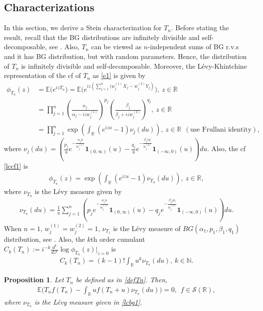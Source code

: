 \documentclass[12pt, a4paper,reqno]{amsart}
\newtheorem{pro}[thm]{Proposition}
\theoremstyle{definition}
\theoremstyle{myremark}
\numberwithin{equation}{section}
\begin{document}
\subsection{Characterizations}
 In this section, we derive a Stein characterization for $T_n$. Before stating the result, recall that the BG distributions are infinitely divisible and self-decomposable, see \cite{bilateral0}. Also, $T_n$ can be viewed as $n$-independent sums of BG r.v.s and it has BG distribution, but with random parameters. Hence, the distribution of $T_n$ is infinitely divisible and self-decomposable. Moreover, the L\'evy-Khintchine representation of the cf of $T_n$ as \eqref{e1} is given by
\begin{align}
\nonumber\phi_{T_n}(z)&=\mathbb{E}\bigg(e^{iz T_n} \bigg)=\mathbb{E}\bigg(e^{iz \left(\sum_{j=1}^{n} (w_j^{(1)}X_j-w_j^{(2)}Y_j\right) }\bigg),~z\in\mathbb{R}\\
\label{01cflcbg}&=\prod_{j=1}^{n}\left(\frac{\alpha_j}{\alpha_j-izw_{j}^{(1)}} \right)^{p_j}  \left(\frac{\beta_j}{\beta_j+izw_{j}^{(2)}}\right)^{q_j} ,~z\in\mathbb{R} \\
\label{lccf1}&=\prod_{j=1}^{n}\exp \left(\displaystyle\int_{\mathbb{R}}(e^{izu}-1) \nu_j(du)  \right),~z\in\mathbb{R} ~~(\text{use Frullani identity}),
\end{align} 
where $\nu_j(du)=\left(\frac{p_j}{u}e^{-\frac{\alpha_j u}{w_{j}^{(1)}}}\mathbf{1}_{(0,\infty)}(u)-\frac{q_j}{u}e^{-\frac{\beta_j |u|}{w_{j}^{(2)}}}\mathbf{1}_{(-\infty,0)}(u)\right)du.$ Also, the cf \eqref{lccf1} is
\begin{align}\label{lcbg2}
\phi_{T_{n}}(z)=\exp\left(\displaystyle\int_{\mathbb{R}}(e^{izu}-1) \nu_{T_n}(du)  \right), 	~z\in\mathbb{R},
\end{align}
\noindent
where $\nu_{T_n}$ is the L\'evy measure given by
\begin{align}\label{lcbg1}
\nu_{T_n}(du)=\frac{1}{u}\sum_{j=1}^{n}\left(p_je^{-\frac{\alpha_j u}{w_{j}^{(1)}}}\mathbf{1}_{(0,\infty)}(u)-q_je^{-\frac{\beta_j |u|}{w_{j}^{(2)}}}\mathbf{1}_{(-\infty,0)}(u) \right)du.
\end{align}
\noindent
When $n=1$, $w_{j}^{(1)}=w_{j}^{(2)}=1$, $\nu_{T_1}$ is the L\'evy measure of $BG(\alpha_1,p_1,\beta_1,q_1)$ distribution, see \cite{bilateral0}. Also, the $k$th order cumulant $C_k(T_n):=i^{-k}\frac{d^k}{dz^k}\log	\phi_{T_n}(z)|_{z=0}$ is
\begin{align}\label{cumu}
	C_k(T_n)=(k-1)! \int_{\mathbb{{R}}}u^{k}\nu_{T_n}(du),~k\in\mathbb{N}.
\end{align} 
\begin{pro}\label{th1}
	 Let $T_n$ be defined as in \eqref{defTn}. Then,
	\begin{align}\label{PP2:StenIdTn}
	\mathbb{E}\bigg(T_nf(T_n)-\displaystyle\int_{\mathbb{{R}}}uf(T_n+u)\nu_{T_n}(du) \bigg)=0,~~f\in\mathcal{S}(\mathbb{R}),
	\end{align}
	where $\nu_{T_n}$ is the L\'evy measure given in \eqref{lcbg1}.
\end{pro}
\end{document}

